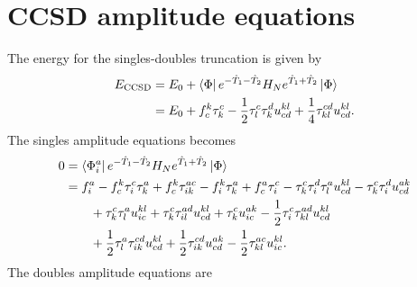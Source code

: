     \section{CCSD amplitude equations}
        The energy for the singles-doubles truncation is given by
        \begin{align}
            E_{\text{CCSD}}
            &= E_{0}
            + \bra{\Phi} e^{-\hat{T}_1 - \hat{T}_2} H_N e^{\hat{T}_1 + \hat{T}_2}
            \ket{\Phi}
            \\
            &=
            E_{0}
            +
            f^{k}_{c} \tau^{c}_{k}
            - \frac{1}{2} \tau^{c}_{l} \tau^{d}_{k} u^{kl}_{cd}
            + \frac{1}{4} \tau^{cd}_{kl} u^{kl}_{cd}.
        \end{align}
        The singles amplitude equations becomes
        \begin{align}
            0 & = \bra{\Phi^{a}_{i}} e^{-\hat{T}_1 - \hat{T}_2} H_N
            e^{\hat{T}_1 + \hat{T}_2}\ket{\Phi}
            \\
            &=
            f^{a}_{i}
            - f^{k}_{c} \tau^{c}_{i} \tau^{a}_{k}
            + f^{k}_{c} \tau^{ac}_{ik}
            - f^{k}_{i} \tau^{a}_{k}
            + f^{a}_{c} \tau^{c}_{i}
            - \tau^{c}_{k} \tau^{d}_{i} \tau^{a}_{l} u^{kl}_{cd}
            - \tau^{c}_{k} \tau^{d}_{i} u^{ak}_{cd}
            \nonumber \\
            &\qquad
            + \tau^{c}_{k} \tau^{a}_{l} u^{kl}_{ic}
            + \tau^{c}_{k} \tau^{ad}_{il} u^{kl}_{cd}
            + \tau^{c}_{k} u^{ak}_{ic}
            - \frac{1}{2} \tau^{c}_{i} \tau^{ad}_{kl} u^{kl}_{cd}
            \nonumber \\
            &\qquad
            + \frac{1}{2} \tau^{a}_{l} \tau^{cd}_{ik} u^{kl}_{cd}
            + \frac{1}{2} \tau^{cd}_{ik} u^{ak}_{cd}
            - \frac{1}{2} \tau^{ac}_{kl} u^{kl}_{ic}.
        \end{align}
        The doubles amplitude equations are
